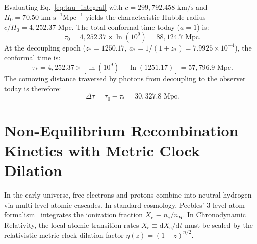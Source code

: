 \documentclass[aps,prd,reprint,superscriptaddress,nofootinbib,twocolumn]{revtex4-2}
\begin{document}
Evaluating Eq.~\eqref{eq:tau_integral} with $c = 299{,}792.458\text{ km/s}$ and $H_0 = 70.50\text{ km s}^{-1}\text{Mpc}^{-1}$ yields the characteristic Hubble radius $c/H_0 = 4{,}252.37\text{ Mpc}$. The total conformal time today ($a = 1$) is:
\begin{equation}
\label{eq:tau_0_eval}
\tau_0 = 4{,}252.37 \times \ln(10^9) = 88{,}124.7\text{ Mpc}.
\end{equation}
At the decoupling epoch ($z_* = 1250.17$, $a_* = 1/(1 + z_*) = 7.9925 \times 10^{-4}$), the conformal time is:
\begin{equation}
\label{eq:tau_star_eval}
\tau_* = 4{,}252.37 \times \left[\ln(10^9) - \ln(1251.17)\right] = 57{,}796.9\text{ Mpc}.
\end{equation}
The comoving distance traversed by photons from decoupling to the observer today is therefore:
\begin{equation}
\label{eq:delta_tau_eval}
\Delta\tau = \tau_0 - \tau_* = 30{,}327.8\text{ Mpc}.
\end{equation}

\section{Non-Equilibrium Recombination Kinetics with Metric Clock Dilation}
\label{sec:recombination}

In the early universe, free electrons and protons combine into neutral hydrogen via multi-level atomic cascades. In standard cosmology, Peebles' 3-level atom formalism~\cite{Peebles1968,Seager2000} integrates the ionization fraction $X_e \equiv n_e / n_H$. In Chronodynamic Relativity, the local atomic transition rates $\dot{X}_e \equiv \mathrm{d}X_e/\mathrm{d}t$ must be scaled by the relativistic metric clock dilation factor $\eta(z) = (1+z)^{n/2}$.
\end{document}
